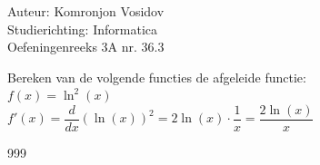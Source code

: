 \documentclass[a4paper]{article}
\begin{document}
	
	\noindent \large Auteur: Komronjon Vosidov \\
	\noindent \large Studierichting: Informatica\\
	\noindent \large Oefeningenreeks 3A nr. 36.3\\
	
	\medskip
	
	\normalsize
	Bereken van de volgende functies de afgeleide functie:\\
	
	$f(x) = \ln^2(x)$\\
	
	$f'(x) = \dfrac{d}{dx} (\ln(x))^2 = 2 \ln(x) \cdot \dfrac{1}{x} = \dfrac{2 \ln(x)}{x}$
	
	
	\begin{thebibliography}{999}
	\end{thebibliography}	
	
\end{document}
